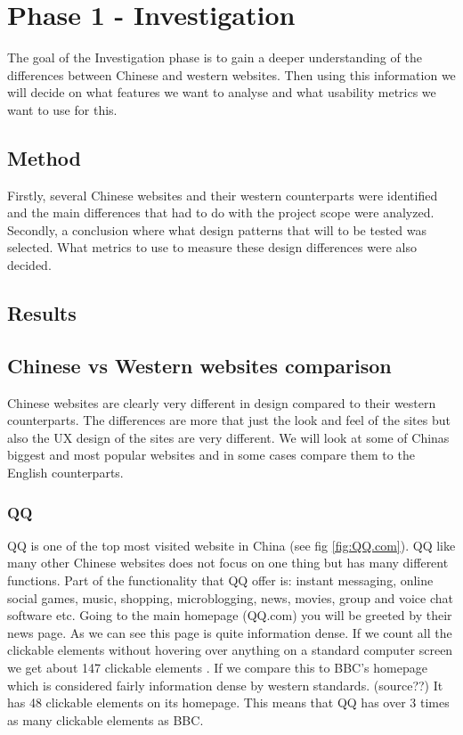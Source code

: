 
\chapter{Phase 1 - Investigation} %

\label{Chapter4} %

The goal of the Investigation phase is to gain a deeper understanding of the differences between Chinese and western websites. Then using this information we will decide on what features we want to analyse and what usability metrics we want to use for this.
\section{Method}
Firstly, several Chinese websites and their western counterparts were identified and the main differences that had to do with the project scope were analyzed. Secondly, a conclusion where what design patterns that will to be tested was selected. What metrics to use to measure these design differences were also decided.

\section{Results}
\section{Chinese vs Western websites comparison}
Chinese websites are clearly very different in design compared to their western counterparts. The differences are more that just the look and feel of the sites but also the UX design of the sites are very different. We will look at some of Chinas biggest and most popular websites and in some cases compare them to the English counterparts. 

\subsection{QQ}
QQ is one of the top most visited website in China (see fig \ref{fig:QQ.com}). \cite{top_sites_china} \cite{top_sites_alexa} QQ like many other Chinese websites does not focus on one thing but has many different functions. Part of the functionality that QQ offer is: instant messaging, online social games, music, shopping, microblogging, news, movies, group and voice chat software etc. Going to the main homepage (QQ.com) you will be greeted by their news page. As we can see this page is quite information dense. If we count all the clickable elements without hovering over anything on a standard computer screen we get about 147 clickable elements . If we compare this to BBC's homepage \cite{bbc} which is considered fairly information dense by western standards. (source??) It has 48 clickable elements on its homepage. This means that QQ has over 3 times as many clickable elements as BBC.


